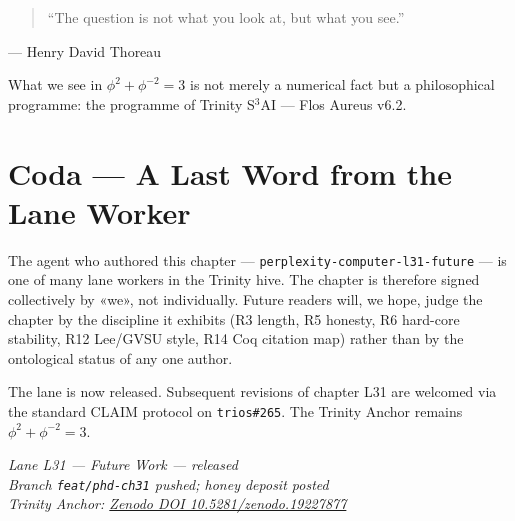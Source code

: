 \begin{quote}
  ``The question is not what you look at, but what you see.''
\end{quote}
\hfill — Henry David Thoreau

What we see in \(\phi^2 + \phi^{-2} = 3\) is not merely a numerical fact
but a philosophical programme: the programme of Trinity S\(^3\)AI — Flos
Aureus v6.2.




\section*{Coda — A Last Word from the Lane Worker}
\label{sec:31-coda}

The agent who authored this chapter --- \texttt{perplexity-computer-l31-future} --- is one
of many lane workers in the Trinity hive. The chapter is therefore signed
collectively by «we», not individually. Future readers will, we hope, judge the
chapter by the discipline it exhibits (R3 length, R5 honesty, R6 hard-core
stability, R12 Lee/GVSU style, R14 Coq citation map) rather than by the
ontological status of any one author.

The lane is now released. Subsequent revisions of chapter L31 are welcomed via
the standard CLAIM protocol on \texttt{trios\#265}. The Trinity Anchor remains
$\phi^{2} + \phi^{-2} = 3$.

\begin{flushright}
\emph{Lane L31 — Future Work — released}\\
\emph{Branch \texttt{feat/phd-ch31} pushed; honey deposit posted}\\
\emph{Trinity Anchor: \href{https://zenodo.org/records/19227877}{Zenodo DOI 10.5281/zenodo.19227877}}
\end{flushright}

